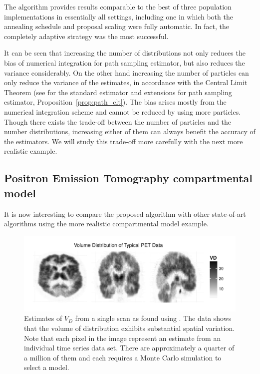 The \smc algorithm provides results comparable to the best of
three population \mcmc implementations in essentially all settings, including
one in which both the annealing schedule and proposal scaling were fully
automatic. In fact, the completely adaptive strategy was the most successful.

It can be seen that increasing the number of distributions not only reduces
the bias of numerical integration for path sampling estimator, but also
reduces the variance considerably. On the other hand increasing the number of
particles can only reduce the variance of the estimates, in accordance with
the Central Limit Theorem (see \cite{DelMoral:2006hc} for the standard
estimator and extensions for path sampling estimator,
Proposition~\ref{prop:path_clt}). The bias arises mostly from the numerical
integration scheme and cannot be reduced by using more particles. Though there
exists the trade-off between the number of particles and the number
distributions, increasing either of them can always benefit the accuracy of
the estimators. We will study this trade-off more carefully with the next more
realistic example.

\subsection{Positron Emission Tomography compartmental model}
\label{sub:Positron Emission Tomography compartmental model}

It is now interesting to compare the proposed algorithm with other
state-of-art algorithms using the more realistic \pet compartmental model
example.

\begin{figure}[t]
  \includegraphics[width=\linewidth]{fig/PETPlot-smc2-ps-bw}
  \caption[Volume of distribution of real \protect\pet compartmental model
  data]
  {Estimates of $V_D$ from a single \pet scan as found using \smc[2].
    The data shows that the volume of distribution exhibits substantial
    spatial variation. Note that each pixel in the image represent an estimate
    from an individual time series data set. There are approximately a quarter
    of a million of them and each requires a Monte Carlo simulation to select
    a model.}
  \label{fig:petplot}
\end{figure}

